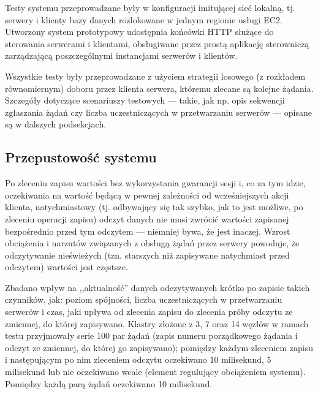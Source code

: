 Testy systemu przeprowadzane były w konfiguracji imitującej sieć lokalną, tj. serwery i klienty bazy danych rozlokowane w jednym regionie usługi EC2. Utworzony system prototypowy udostępnia końcówki HTTP służące do sterowania serwerami i klientami, obsługiwane przez prostą aplikację sterowniczą zarządzającą poszczególnymi instancjami serwerów i klientów.

Wszystkie testy były przeprowadzane z użyciem strategii losowego (z rozkładem równomiernym) doboru przez klienta serwera, któremu zlecane są kolejne żądania. Szczegóły dotyczące scenariuszy testowych --- takie, jak np. opis sekwencji zgłaszania żądań czy liczba uczestniczących w przetwarzaniu serwerów --- opisane są w dalszych podsekcjach.




\subsection{Przepustowość systemu}

Po zleceniu zapisu wartości bez wykorzystania gwarancji sesji i, co za tym idzie, oczekiwania na wartość będącą w pewnej zależności od wcześniejszych akcji klienta, natychmiastowy (tj. odbywający się tak szybko, jak to jest możliwe, po zleceniu operacji zapisu) odczyt danych nie musi zwrócić wartości zapisanej bezpośrednio przed tym odczytem --- niemniej bywa, że jest inaczej. Wzrost obciążenia i narzutów związanych z obsługą żądań przez serwery powoduje, że odczytywanie nieświeżych (tzn. starszych niż zapisywane natychmiast przed odczytem) wartości jest częstsze.

Zbadano wpływ na ,,aktualność'' danych odczytywanych krótko po zapisie takich czynników, jak: poziom spójności, liczba uczestniczących w przetwarzaniu serwerów i czas, jaki upływa od zlecenia zapisu do zlecenia próby odczytu ze zmiennej, do której zapisywano. Klastry złożone z 3, 7 oraz 14 węzłów w ramach testu przyjmowały serie 100 par żądań (zapis numeru porządkowego żądania i odczyt ze zmiennej, do której go zapisywano); pomiędzy każdym zleceniem zapisu i następującym po nim zleceniem odczytu oczekiwano 10 milisekund, 5 milisekund lub nie oczekiwano wcale (element regulujący obciążeniem systemu). Pomiędzy każdą parą żądań oczekiwano 10 milisekund.

